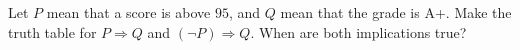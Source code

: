 Let $P$ mean that a score is above $95$, and $Q$ mean that the grade is A+. Make the truth table for $P\Rightarrow Q$ and $(\neg P)\Rightarrow Q$. When are both implications true?
